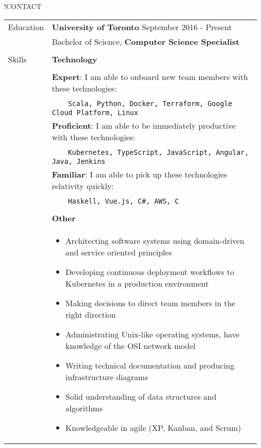 \documentclass[letterpaper,12pt,oneside]{article}
\newcommand{\tabitem}{~~\llap{\textbullet}~~}
\begin{document}
!CONTACT

\noindent \begin{longtable}{@{} l p{14cm}}
\Large{Education} & \large{\textbf{University of Toronto}} September 2016 - Present\\
                  & Bachelor of Science, \textbf{Computer Science Specialist} \\
                  & \\
\Large{Skills}
& \large{\textbf{Technology}} \\
& \\
& \textbf{Expert}: I am able to onboard new team members with these technologies: \\
& \vspace{0.2cm} \tabitem \texttt{Scala, Python, Docker, Terraform, Google Cloud Platform, Linux} \\
& \textbf{Proficient}: I am able to be immediately productive with these technologies: \\
& \vspace{0.2cm} \tabitem \texttt{Kubernetes, TypeScript, JavaScript, Angular, Java, Jenkins} \\
& \textbf{Familiar}: I am able to pick up these technologies relativity quickly: \\
& \vspace{0.2cm} \tabitem \texttt{Haskell, Vue.js, C\#, AWS, C} \\
& \\
& \large{\textbf{Other}} \\
& \begin{itemize}[leftmargin=*,topsep=0pt,partopsep=0pt]
      \setlength\itemsep{0em}
      \item Architecting software systems using domain-driven and service oriented principles
      \item Developing continuous deployment workflows to Kubernetes in a production environment
      \item Making decisions to direct team members in the right direction
      \item Administrating Unix-like operating systems, have knowledge of the OSI network model
      \item Writing technical documentation and producing infrastructure diagrams
      \item Solid understanding of data structures and algorithms
      \item Knowledgeable in agile (XP, Kanban, and Scrum)
\end{itemize} \\

\end{longtable}
\end{document}
